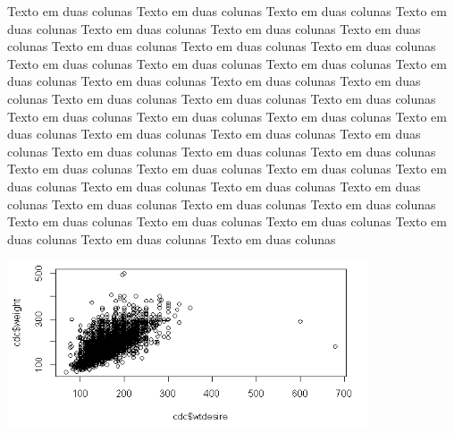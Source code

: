 \documentclass[12pt,a4paper]{article}
\begin{document}
\begin{multicols}{2} %
Texto em duas colunas Texto em duas colunas Texto em duas colunas Texto em duas colunas Texto em duas colunas Texto em duas colunas Texto em duas colunas Texto em duas colunas Texto em duas colunas Texto em duas colunas Texto em duas colunas Texto em duas colunas Texto em duas colunas Texto em duas colunas Texto em duas colunas Texto em duas colunas Texto em duas colunas Texto em duas colunas Texto em duas colunas Texto em duas colunas Texto em duas colunas Texto em duas colunas Texto em duas colunas Texto em duas colunas Texto em duas colunas Texto em duas colunas Texto em duas colunas Texto em duas colunas Texto em duas colunas Texto em duas colunas Texto em duas colunas Texto em duas colunas Texto em duas colunas Texto em duas colunas Texto em duas colunas Texto em duas colunas Texto em duas colunas Texto em duas colunas Texto em duas colunas Texto em duas colunas Texto em duas colunas Texto em duas colunas Texto em duas colunas Texto em duas colunas Texto em duas colunas Texto em duas colunas 
\end{multicols}

\includegraphics[width=0.8\textwidth]{figuras/q1.PNG} %
\end{document}
